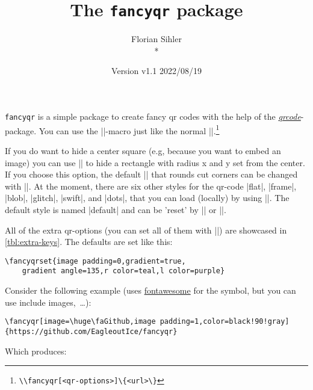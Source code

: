 \documentclass[parskip=half,english,numbers=noenddot,footnotes=nomultiple,oneside]{scrartcl}
\title{The \texttt{fancyqr} package}
\author{%
	\texorpdfstring{Florian Sihler\medskip\\*
		\fancyqr{https://github.com/EagleoutIce/fancyqr}
	}{Florian Sihler}}
\date{Version v1.1 \textendash{} 2022/08/19}
\def\ltx#1{\lstinline/#1/}
\begin{document}
   \maketitle


	\texttt{fancyqr} is a simple package to create fancy qr codes with the help of the \textit{\href{https://www.ctan.org/pkg/qrcode}{qrcode}}-package.
	You can use the |\fancyqr|-macro just like the normal |\qrcode|.\footnote{\ltx{\\fancyqr[<qr-options>]\{<url>\}}}

	If you do want to hide a center square (e.g, because you want to embed an image) you can use || to hide a rectangle with radius x and y set from the center. If you choose this option, the default |\FancyQrRoundCut| that rounds cut corners can be changed with |\FancyQrHardCut|.
	At the moment, there are six other styles for the qr-code |flat|, |frame|, |blob|, |glitch|, |swift|, and |dots|, that you can load (locally) by using ||. The default style is named |default| and can be 'reset' by || or |\FancyQrLoadDefault|.

	All of the extra qr-options (you can set all of them with ||) are showcased in \autoref{tbl:extra-keys}.
	The defaults are set like this:
\begin{lstlisting}
\fancyqrset{image padding=0,gradient=true,
	gradient angle=135,r color=teal,l color=purple}
\end{lstlisting}
	Consider the following example (uses \href{https://www.ctan.org/pkg/fontawesome}{fontawesome} for the symbol, but you can use include images,~\ldots):
\begin{lstlisting}
\fancyqr[image=\huge\faGithub,image padding=1,color=black!90!gray]{https://github.com/EagleoutIce/fancyqr}
\end{lstlisting}

	\parbox[c]{.3\linewidth}{Which produces:}\hfill\parbox[c]{.4\linewidth}{\raggedleft{}}\par
\end{document}

